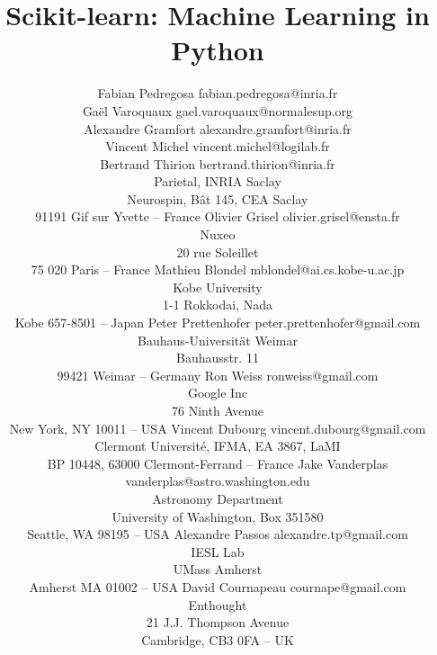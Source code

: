 \documentclass[twoside,11pt]{article}
\begin{document}
\title{Scikit-learn: Machine Learning in Python}


\author{\name Fabian Pedregosa \email fabian.pedregosa@inria.fr \\
        \name Ga\"el Varoquaux \email gael.varoquaux@normalesup.org  \\
        \name Alexandre Gramfort \email alexandre.gramfort@inria.fr \\
        \name Vincent Michel  \email vincent.michel@logilab.fr \\
        \name Bertrand Thirion  \email bertrand.thirion@inria.fr \\
        \addr Parietal, INRIA Saclay  \\Neurospin,
      B\^at 145, CEA Saclay \\91191 Gif sur Yvette -- France
        \AND
        \name Olivier Grisel \email olivier.grisel@ensta.fr \\
        \addr Nuxeo \\20 rue Soleillet \\75 020 Paris -- France 
        \AND
        \name Mathieu Blondel \email mblondel@ai.cs.kobe-u.ac.jp \\
        \addr Kobe University \\1-1 Rokkodai, Nada \\Kobe 657-8501 -- Japan
        \AND
        \name Peter Prettenhofer \email peter.prettenhofer@gmail.com \\
        \addr Bauhaus-Universit\"at Weimar \\Bauhausstr. 11 \\99421 Weimar -- Germany
        \AND
        \name Ron Weiss \email ronweiss@gmail.com \\
        \addr Google Inc \\76 Ninth Avenue \\New York, NY 10011 -- USA
        \AND
        \name Vincent Dubourg \email vincent.dubourg@gmail.com\\
        \addr Clermont Universit\'e, IFMA, EA 3867, LaMI\\
        BP 10448, 63000 Clermont-Ferrand -- France
        \AND
        \name Jake Vanderplas \email vanderplas@astro.washington.edu\\
        \addr Astronomy Department \\University of Washington, Box 351580 \\
	Seattle, WA 98195 -- USA
	\AND
        \name Alexandre Passos \email alexandre.tp@gmail.com \\
        \addr IESL Lab \\UMass Amherst \\Amherst MA 01002 -- USA
        \AND
        \name David Cournapeau \email cournape@gmail.com \\
        \addr Enthought \\21 J.J. Thompson Avenue \\Cambridge, CB3 0FA --
	UK
}
\end{document}
